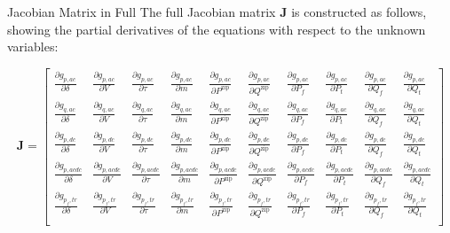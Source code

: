 \begin{frame}{Jacobian Matrix in Full}
    \scriptsize  %
    The full Jacobian matrix $\mathbf{J}$ is constructed as follows, showing the partial derivatives of the equations with respect to the unknown variables:
    
    \[
    \mathbf{J} = 
    \begin{bmatrix}
        \frac{\partial g_{p,ac}}{\partial \delta} & \frac{\partial g_{p,ac}}{\partial V} & \frac{\partial g_{p,ac}}{\partial \tau} & \frac{\partial g_{p,ac}}{\partial m} & \frac{\partial g_{p,ac}}{\partial P^\text{zip}} & \frac{\partial g_{p,ac}}{\partial Q^\text{zip}} & \frac{\partial g_{p,ac}}{\partial P_f} & \frac{\partial g_{p,ac}}{\partial P_t} & \frac{\partial g_{p,ac}}{\partial Q_f} & \frac{\partial g_{p,ac}}{\partial Q_t} \\
        \frac{\partial g_{q,ac}}{\partial \delta} & \frac{\partial g_{q,ac}}{\partial V} & \frac{\partial g_{q,ac}}{\partial \tau} & \frac{\partial g_{q,ac}}{\partial m} & \frac{\partial g_{q,ac}}{\partial P^\text{zip}} & \frac{\partial g_{q,ac}}{\partial Q^\text{zip}} & \frac{\partial g_{q,ac}}{\partial P_f} & \frac{\partial g_{q,ac}}{\partial P_t} & \frac{\partial g_{q,ac}}{\partial Q_f} & \frac{\partial g_{q,ac}}{\partial Q_t} \\
        \frac{\partial g_{p,dc}}{\partial \delta} & \frac{\partial g_{p,dc}}{\partial V} & \frac{\partial g_{p,dc}}{\partial \tau} & \frac{\partial g_{p,dc}}{\partial m} & \frac{\partial g_{p,dc}}{\partial P^\text{zip}} & \frac{\partial g_{p,dc}}{\partial Q^\text{zip}} & \frac{\partial g_{p,dc}}{\partial P_f} & \frac{\partial g_{p,dc}}{\partial P_t} & \frac{\partial g_{p,dc}}{\partial Q_f} & \frac{\partial g_{p,dc}}{\partial Q_t} \\
        \frac{\partial g_{p,acdc}}{\partial \delta} & \frac{\partial g_{p,acdc}}{\partial V} & \frac{\partial g_{p,acdc}}{\partial \tau} & \frac{\partial g_{p,acdc}}{\partial m} & \frac{\partial g_{p,acdc}}{\partial P^\text{zip}} & \frac{\partial g_{p,acdc}}{\partial Q^\text{zip}} & \frac{\partial g_{p,acdc}}{\partial P_f} & \frac{\partial g_{p,acdc}}{\partial P_t} & \frac{\partial g_{p,acdc}}{\partial Q_f} & \frac{\partial g_{p,acdc}}{\partial Q_t} \\
        \frac{\partial g_{p_f,tr}}{\partial \delta} & \frac{\partial g_{p_f,tr}}{\partial V} & \frac{\partial g_{p_f,tr}}{\partial \tau} & \frac{\partial g_{p_f,tr}}{\partial m} & \frac{\partial g_{p_f,tr}}{\partial P^\text{zip}} & \frac{\partial g_{p_f,tr}}{\partial Q^\text{zip}} & \frac{\partial g_{p_f,tr}}{\partial P_f} & \frac{\partial g_{p_f,tr}}{\partial P_t} & \frac{\partial g_{p_f,tr}}{\partial Q_f} & \frac{\partial g_{p_f,tr}}{\partial Q_t} \\

\end{bmatrix}\]
\end{frame}
